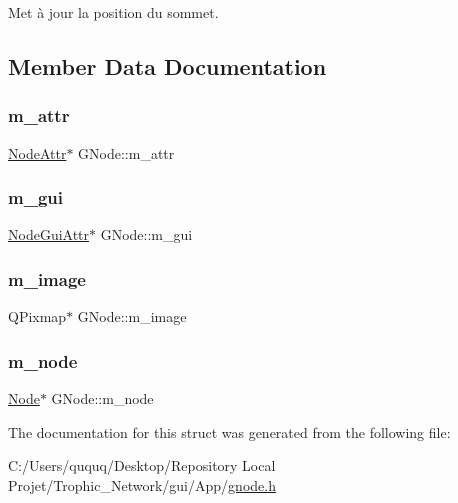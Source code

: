 Met à jour la position du sommet. 



\subsection{Member Data Documentation}
\mbox{\label{struct_g_node_a9af79b0be58beeca8e76eef4d1798555}} 
\subsubsection{\texorpdfstring{m\+\_\+attr}{m\_attr}}
{\footnotesize\ttfamily \mbox{\hyperlink{struct_node_attr}{Node\+Attr}}$\ast$ G\+Node\+::m\+\_\+attr}

\mbox{\label{struct_g_node_a3883c1648b5f4b39872eac62d0d9f74d}} 
\subsubsection{\texorpdfstring{m\+\_\+gui}{m\_gui}}
{\footnotesize\ttfamily \mbox{\hyperlink{struct_node_gui_attr}{Node\+Gui\+Attr}}$\ast$ G\+Node\+::m\+\_\+gui}

\mbox{\label{struct_g_node_a77e0c9572f6f27150ed75b3a55120d08}} 
\subsubsection{\texorpdfstring{m\+\_\+image}{m\_image}}
{\footnotesize\ttfamily Q\+Pixmap$\ast$ G\+Node\+::m\+\_\+image}

\mbox{\label{struct_g_node_a1f5acd0ae89f506fdbd8674b0cda648c}} 
\subsubsection{\texorpdfstring{m\+\_\+node}{m\_node}}
{\footnotesize\ttfamily \mbox{\hyperlink{class_node}{Node}}$\ast$ G\+Node\+::m\+\_\+node}



The documentation for this struct was generated from the following file\+:\begin{DoxyCompactItemize}
\item 
C\+:/\+Users/ququq/\+Desktop/\+Repository Local Projet/\+Trophic\+\_\+\+Network/gui/\+App/\mbox{\hyperlink{gnode_8h}{gnode.\+h}}\end{DoxyCompactItemize}
